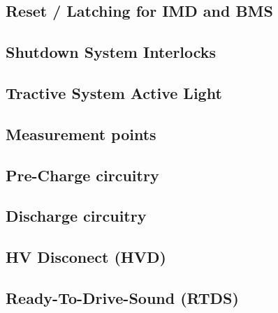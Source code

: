 \documentclass{article}[12pt]
\begin{document}
\subsection{Reset / Latching for IMD and BMS} \label{subsec:Reset}


\subsection{Shutdown System Interlocks}\label{subsec:SDCInterlocks}


\subsection{Tractive System Active Light}\label{subsec:TSAL}


\subsection{Measurement points}\label{subsec:MeasurementPoints}


\subsection{Pre-Charge circuitry}\label{subsec:PrechargeCircuitry}


\subsection{Discharge circuitry}\label{subsec:PrechargeSafety}


\subsection{HV Disconect (HVD)}\label{subsec:HVD}


\subsection{Ready-To-Drive-Sound (RTDS)}\label{subsec:RTDS}

\end{document}

